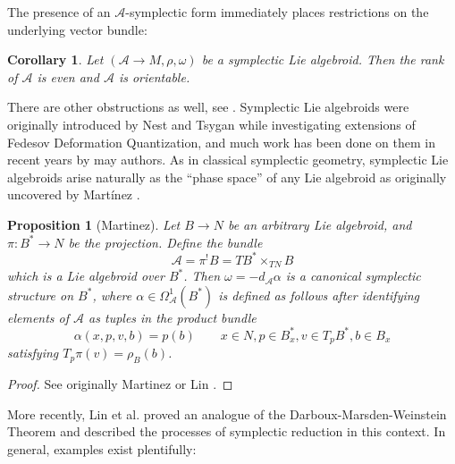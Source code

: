 \documentclass{amsart}
\newcommand{\ra}{\rightarrow}
\newtheorem{corollary}[theorem]{Corollary}
\newtheorem{prop}[theorem]{Proposition}
\newcommand{\A}{\mathcal{A}}
\theoremstyle{definition}
\begin{document}
The presence of an $\A$-symplectic form immediately places restrictions on the underlying vector bundle:
\begin{corollary}
    Let $(\A \ra M, \rho ,\omega)$ be a symplectic Lie algebroid. Then the rank of $\A$ is even and $\A$ is orientable.
\end{corollary}
There are other obstructions as well, see \cite{klaasse2017geometric}. Symplectic Lie algebroids were originally introduced by Nest and Tsygan \cite{nest1999deformations} while investigating extensions of Fedesov Deformation Quantization, and much work has been done on them in recent years by may authors. As in classical symplectic geometry, symplectic Lie algebroids arise naturally as the ``phase space'' of any Lie algebroid as originally uncovered by Mart\'inez \cite{Martinez}.
\begin{prop}[Martinez]
    Let $B \ra N$ be an arbitrary Lie algebroid, and $\pi:B^* \ra N$ be the projection. Define the bundle
    \begin{equation*}
        \A = \pi^! B = TB^* \times_{TN}B
    \end{equation*}
    which is a Lie algebroid over $B^*$. Then $\omega = -d_\A\alpha$
    is a canonical symplectic structure on $B^*$, where $\alpha\in \Omega_\A^1(B^*)$ is defined as follows after identifying elements of $\A$ as tuples in the product bundle
    \begin{equation*}
        \alpha(x,p,v,b) = p(b) \qquad x \in N, p \in B^*_x , v \in T_p B^*, b \in B_x
    \end{equation*}
    satisfying $T_p \pi(v) = \rho_B(b)$. 
 \end{prop}
 \begin{proof}
     See originally Martinez \cite[Section 7]{Martinez} or Lin \cite[Proposition 2.2.1]{Lin_2023}.
 \end{proof}
 More recently, Lin et al. \cite{Lin_2023} proved an analogue of the Darboux-Marsden-Weinstein Theorem and described the processes of symplectic reduction in this context. In general, examples exist plentifully: 
\end{document}
